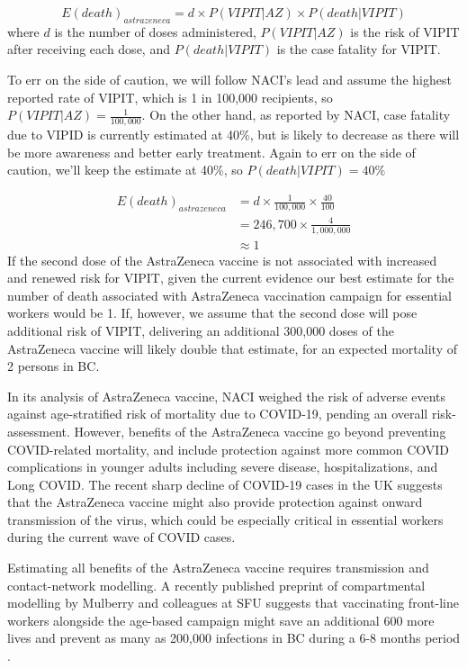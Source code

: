 \documentclass[]{interact}
\theoremstyle{plain}%
\theoremstyle{definition}
\theoremstyle{remark}
\begin{document}
\[
E(death)_{astrazeneca}  = d \times P(VIPIT|AZ) \times P(death|VIPIT)
\] where \(d\) is the number of doses administered, \(P(VIPIT|AZ)\) is
the risk of VIPIT after receiving each dose, and \(P(death|VIPIT)\) is
the case fatality for VIPIT.

To err on the side of caution, we will follow NACI's lead and assume the
highest reported rate of VIPIT, which is 1 in 100,000 recipients, so
\(P(VIPIT|AZ) = \frac{1}{100,000}\). On the other hand, as reported by
NACI, case fatality due to VIPID is currently estimated at 40\%, but is
likely to decrease as there will be more awareness and better early
treatment. Again to err on the side of caution, we'll keep the estimate
at 40\%, so \(P(death|VIPIT)=40\%\)

\[
\begin{aligned}
E(death)_{astrazeneca} & = d \times \frac{1}{100,000} \times \frac{40}{100} \\
& = 246,700 \times \frac{4}{1,000,000} \\
& \approx 1  
\end{aligned}
\] If the second dose of the AstraZeneca vaccine is not associated with
increased and renewed risk for VIPIT, given the current evidence our
best estimate for the number of death associated with AstraZeneca
vaccination campaign for essential workers would be 1. If, however, we
assume that the second dose will pose additional risk of VIPIT,
delivering an additional 300,000 doses of the AstraZeneca vaccine will
likely double that estimate, for an expected mortality of 2 persons in
BC.

In its analysis of AstraZeneca vaccine, NACI weighed the risk of adverse
events against age-stratified risk of mortality due to COVID-19, pending
an overall risk-assessment. However, benefits of the AstraZeneca vaccine
go beyond preventing COVID-related mortality, and include protection
against more common COVID complications in younger adults including
severe disease, hospitalizations, and Long COVID. The recent sharp
decline of COVID-19 cases in the UK suggests that the AstraZeneca
vaccine might also provide protection against onward transmission of the
virus, which could be especially critical in essential workers during
the current wave of COVID cases.

Estimating all benefits of the AstraZeneca vaccine requires transmission
and contact-network modelling. A recently published preprint of
compartmental modelling by Mulberry and colleagues at SFU suggests that
vaccinating front-line workers alongside the age-based campaign might
save an additional 600 more lives and prevent as many as 200,000
infections in BC during a 6-8 months period
\citep[preprint][]{mulberry_vaccine_2021}.
\end{document}
